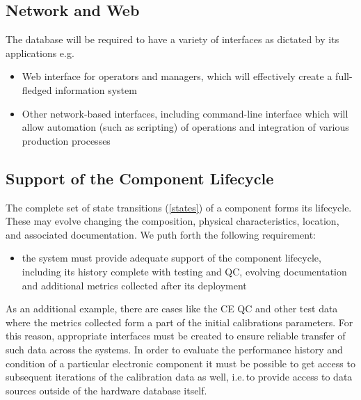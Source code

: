 \documentclass[pdftex,12pt,letter]{article}
\begin{document}
\subsection{Network and Web}

The database will be required to have a variety of interfaces as dictated by its applications e.g.

\begin{itemize}

\item Web interface for operators and managers, which will effectively create a full-fledged information system

\item Other network-based interfaces, including command-line interface which will allow automation (such as scripting) of operations
and integration of various production processes

\end{itemize}



\subsection{Support of the Component Lifecycle}

The complete set of state transitions (\ref{states}) of a component forms its lifecycle. These may
evolve changing the composition, physical characteristics, location, and associated documentation.
We puth forth the following requirement:
\begin{itemize}

\item the system must provide adequate support of the component lifecycle, including its history
complete with testing and QC, evolving documentation and additional metrics collected after its deployment

\end{itemize}


\noindent As an additional example, there are cases like the CE QC and other test data where the metrics collected form a part of the
initial calibrations parameters. For this reason, appropriate interfaces must be created to ensure
reliable transfer of such data across the systems. In order to evaluate the performance history and condition of a particular
electronic component it must be possible to get access to subsequent iterations
of the calibration data as well, i.e.\,to provide access to data sources outside of the hardware database itself.
\end{document}

